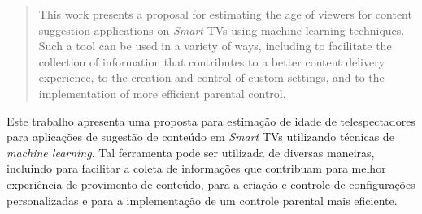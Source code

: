 \begin{abstract}
  This work presents a proposal for estimating the age of viewers for content suggestion applications on \emph {Smart} TVs using machine learning techniques. Such a tool can be used in a variety of ways, including to facilitate the collection of information that contributes to a better content delivery experience, to the creation and control of custom settings, and to the implementation of more efficient parental control.
\end{abstract}

\begin{resumo}
  Este trabalho apresenta uma proposta para estimação de idade de telespectadores para aplicações de sugestão de conteúdo em \emph{Smart} TVs utilizando técnicas de \emph{machine learning}. Tal ferramenta pode ser utilizada de diversas maneiras, incluindo para facilitar a coleta de informações que contribuam para melhor experiência de provimento de conteúdo,  para a criação e controle de configurações personalizadas e para a implementação de um controle parental mais eficiente.
\end{resumo}
